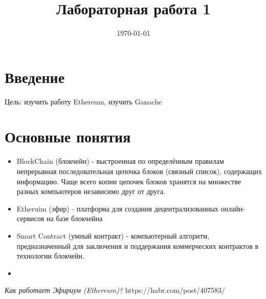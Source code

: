 \documentclass{article}
\begin{document}
\title{Лабораторная работа 1}

\date{\today}
\maketitle


\section{Введение}

Цель: изучить работу Ethereum, изучить Ganache


\section{Основные понятия}

\begin{itemize}
	\item BlockChain (блокчейн) - выстроенная по определённым правилам непрерывная последовательная цепочка блоков (связный список), содержащих информацию. Чаще всего копии цепочек блоков хранятся на множестве разных компьютеров независимо друг от друга. 
	\item Etheruim (эфир) -  платформа для создания децентрализованных онлайн-сервисов на базе блокчейна
	\item Smart Contract (умный контракт) - компьютерный алгоритм, предназначенный для заключения и поддержания коммерческих контрактов в технологии блокчейн. 
	\item 	
\end{itemize}
























\begin{thebibliography}{9}

	  \emph{Как работает Эфириум (Ethereum)?}
	  https://habr.com/post/407583/

\end{thebibliography}
\end{document}
